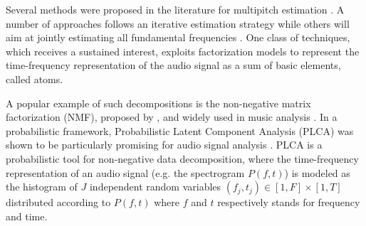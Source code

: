 \documentclass{article}
\begin{document}

\vspace{0.1cm}

Several methods were proposed in the literature for multipitch estimation \cite{Christensen2009_Morgan}. A number of approaches follows an iterative estimation strategy \cite{Klapuri2008} while others will aim at jointly estimating all fundamental frequencies \cite{Davy2006, Vincent2010_IEEE, Fuentes2012_EUSIPCO}. One class of techniques, which receives a sustained interest, exploits factorization models to represent the time-frequency representation of the audio signal as a sum of basic elements, called atoms.

\vspace{0.1cm}

A popular example of such decompositions is the non-negative matrix factorization (NMF), proposed by \cite{Lee99}, and widely used in music analysis \cite{Smaragdis03, Virtanen2008, Durrieu2011, Dessein10}.
In a probabilistic framework, Probabilistic Latent Component Analysis (PLCA) was shown to be particularly promising for audio signal analysis \cite{Benetos11c,Smaragdis06,Smaragdis08}.  
PLCA is a probabilistic tool for non-negative data decomposition, where the time-frequency representation of an audio signal (e.g. the spectrogram $P(f,t)$) is modeled as the histogram of $J$ independent random variables $(f_j,t_j) \in \left[ 1,F \right] \times \left[ 1,T \right]$ distributed according to $P(f,t)$ where $f$ and $t$ respectively stands for frequency and time.
\end{document}
